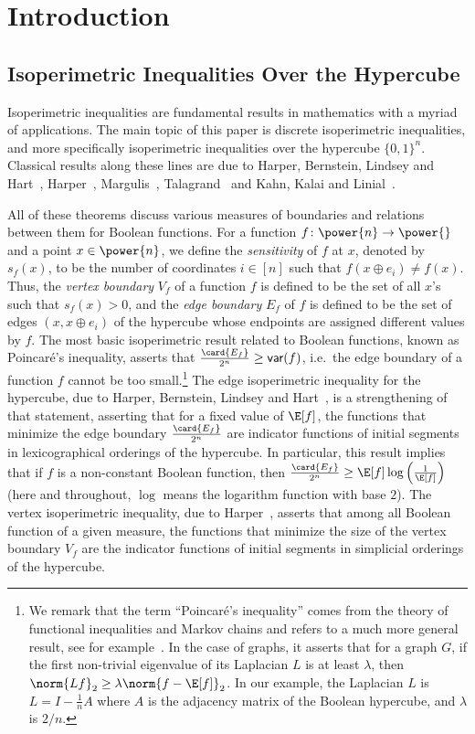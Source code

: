 \section{Introduction}
\subsection{Isoperimetric Inequalities Over the Hypercube}
Isoperimetric inequalities are fundamental results in mathematics with a myriad of applications. The main topic of this paper is discrete isoperimetric
inequalities, and more specifically isoperimetric inequalities over the hypercube $\{0,1\}^n$. Classical results along
these lines are due to Harper, Bernstein, Lindsey and Hart~\cite{Harper2,Bernstein,Lindsey,Hart}, Harper~\cite{Harper2}, Margulis~\cite{Margulis}, Talagrand~\cite{Tal1,Tal2,Tal4} and Kahn, Kalai and Linial~\cite{KKL}.

All of these theorems discuss various measures of boundaries and relations between them for Boolean functions.
For a function $f\colon\power{n}\to\power{}$ and a point $x\in\power{n}$, we define the \emph{sensitivity} of $f$ at $x$, denoted by $s_f(x)$,
to be the number of coordinates $i\in[n]$ such that $f(x\oplus e_i)\neq f(x)$. Thus, the \emph{vertex boundary} $V_f$ of a function $f$ is defined to be the set
of all $x$'s such that $s_f(x) > 0$, and the \emph{edge boundary} $E_f$ of $f$ is defined to be the set of edges $(x,x\oplus e_i)$ of the hypercube whose
endpoints are assigned different values by $f$. The most basic isoperimetric result related to Boolean functions,
known as Poincar\'{e}'s inequality, asserts that $\frac{\card{E_f}}{2^n}\geq {\sf var}(f)$,
i.e.\ the edge boundary of a function $f$ cannot be too small.\footnote{We remark that the term ``Poincar\'{e}'s inequality'' comes from the theory of functional inequalities
and Markov chains and refers to a much more general result, see for example~\cite[Section 2]{kitsos2014inequalities}. In the case of graphs, it asserts that for a graph
$G$, if the first non-trivial eigenvalue of its Laplacian $L$ is at least $\lambda$, then $\norm{L f}_2\geq \lambda \norm{f-\E[f]}_2$. In our
example, the Laplacian $L$ is $L = I-\frac{1}{n} A$ where $A$ is the adjacency matrix of the Boolean hypercube, and $\lambda$ is $2/n$.}
The edge isoperimetric inequality for the hypercube, due to Harper, Bernstein, Lindsey and Hart~\cite{Harper2,Bernstein,Lindsey,Hart}, is a strengthening
of that statement, asserting that for a fixed value of $\E[f]$, the functions that minimize the edge boundary $\frac{\card{E_f}}{2^n}$
are indicator functions
of initial segments in lexicographical orderings of the hypercube. In particular, this result implies that if $f$ is a non-constant Boolean function, then $\frac{\card{E_f}}{2^n}\geq \E[f]\log\left(\frac{1}{\E[f]}\right)$
(here and throughout, $\log$ means the logarithm function with base $2$). The vertex isoperimetric inequality, due to Harper~\cite{Harper2}, asserts that among all Boolean function
of a given measure, the functions that minimize the size of the vertex boundary $V_f$ are the indicator functions of
initial segments in simplicial orderings of the hypercube.
